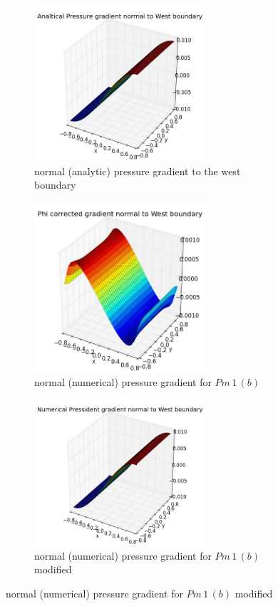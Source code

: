 \begin{figure}[H]
	\centering
	\begin{subfigure}[t]{2.5in}
		\centering
		\includegraphics[width=2.5in]{figures/Pm1b2_unf1_np_W_NPexgrad_t_1_grid_60.jpg}
		\caption{normal (analytic) pressure gradient to the west boundary}\label{fig:6.19a}		
	\end{subfigure}
	\quad
	\begin{subfigure}[t]{2.5in}
		\centering
		\includegraphics[width=2.5in]{figures/Pm1b_unf1_np_W_Nphigrad_t_1_grid_30.jpg}
		\caption{normal (numerical) pressure gradient for $Pm\,1\,(b)$}\label{fig:6.19b}
	\end{subfigure}
	\quad
	\centering
	\begin{subfigure}[t]{2.5in}
		\centering
		\includegraphics[width=2.5in]{figures/Pm1b2_unf1_np_W_Npf_t_1_grid_60.jpg}
		\caption{normal (numerical) pressure gradient for $Pm\,1\,(b)$ modified}\label{fig:6.19a}		

\end{subfigure}
\end{figure}
